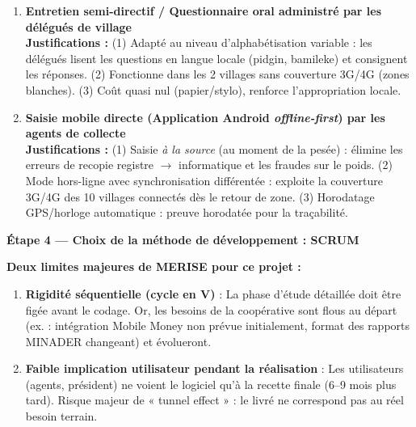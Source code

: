 \documentclass[11pt]{article}
\begin{document}
\begin{exoresolu}
\begin{enumerate}
\item \textbf{Entretien semi-directif / Questionnaire oral administré par les délégués de village} \\
      \textbf{Justifications :} (1) Adapté au niveau d'alphabétisation variable : les délégués lisent les questions en langue locale (pidgin, bamileke) et consignent les réponses. (2) Fonctionne dans les 2 villages sans couverture 3G/4G (zones blanches). (3) Coût quasi nul (papier/stylo), renforce l'appropriation locale.
\item \textbf{Saisie mobile directe (Application Android \emph{offline-first}) par les agents de collecte} \\
      \textbf{Justifications :} (1) Saisie \emph{à la source} (au moment de la pesée) : élimine les erreurs de recopie registre $\to$ informatique et les fraudes sur le poids. (2) Mode hors-ligne avec synchronisation différentée : exploite la couverture 3G/4G des 10 villages connectés dès le retour de zone. (3) Horodatage GPS/horloge automatique : preuve horodatée pour la traçabilité.
\end{enumerate}

\textbf{Étape 4 — Choix de la méthode de développement : SCRUM}

\textbf{Deux limites majeures de MERISE pour ce projet :}
\begin{enumerate}
\item \textbf{Rigidité séquentielle (cycle en V)} : La phase d'étude détaillée doit être figée avant le codage. Or, les besoins de la coopérative sont flous au départ (ex. : intégration Mobile Money non prévue initialement, format des rapports MINADER changeant) et évolueront.
\item \textbf{Faible implication utilisateur pendant la réalisation} : Les utilisateurs (agents, président) ne voient le logiciel qu'à la recette finale (6--9 mois plus tard). Risque majeur de « tunnel effect » : le livré ne correspond pas au réel besoin terrain.
\end{enumerate}


\end{exoresolu}
\end{document}
